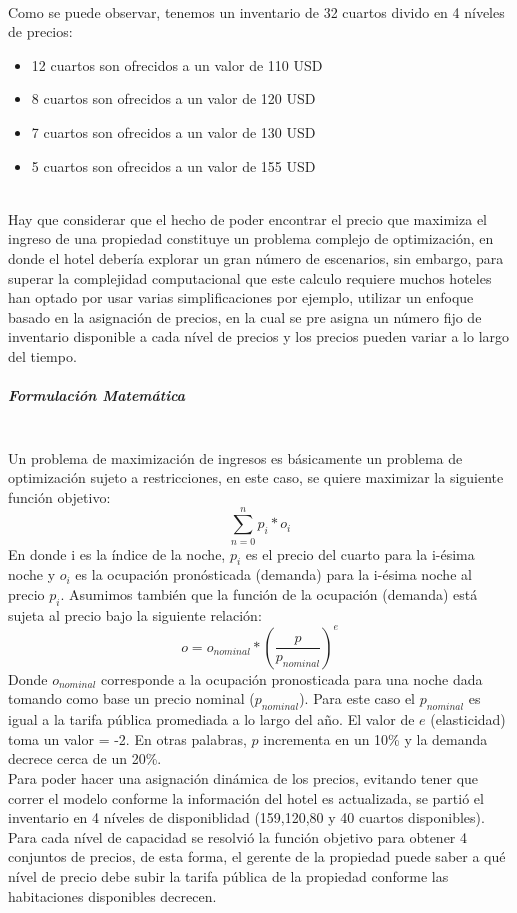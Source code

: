 \documentclass{article}\usepackage[]{graphicx}\usepackage[]{color}
\begin{document}
~\\
Como se puede observar, tenemos un inventario de 32 cuartos divido en 4 níveles de precios:
\begin{itemize}[noitemsep]
\item 12 cuartos son ofrecidos a un valor de 110 USD
\item 8 cuartos son ofrecidos a un valor de 120 USD
\item 7 cuartos son ofrecidos a un valor de 130 USD
\item 5 cuartos son ofrecidos a un valor de 155 USD
\end{itemize}
~\\
Hay que considerar que el hecho de poder encontrar el precio que maximiza el ingreso de una propiedad constituye un problema complejo de optimización, en donde el hotel debería explorar un gran número de escenarios, sin embargo, para superar la complejidad computacional que este calculo requiere muchos hoteles han optado por usar varias simplificaciones por ejemplo, utilizar un enfoque basado en la asignación de precios, en la cual se pre asigna un número fijo de inventario disponible a cada nível de precios y los precios pueden variar a lo largo del tiempo.
~\\
\subparagraph{Formulación Matemática}~\\
Un problema de maximización de ingresos es básicamente un problema de optimización sujeto a restricciones, en este caso, se quiere maximizar la siguiente función objetivo:
$$\sum_{n=0}^{n}p_i*o_i$$
En donde i es la índice de la noche, $p_i$ es el precio del cuarto para la i-ésima noche y $o_i$ es la ocupación pronósticada (demanda) para la i-ésima noche al precio $p_i$. Asumimos también que la función de la ocupación (demanda) está sujeta al precio bajo la siguiente relación:
$$o = o_{nominal} * (\frac{p}{p_{nominal}})^e$$
Donde $o_{nominal}$ corresponde a la ocupación pronosticada para una noche dada tomando como base un precio nominal ($p_{nominal}$). Para este caso el $p_{nominal}$ es igual a la tarifa pública promediada a lo largo del año. El valor de $e$ (elasticidad) toma un valor = -2. En otras palabras, $p$ incrementa en un 10\% y la demanda decrece cerca de un 20\%.
~\\
Para poder hacer una asignación dinámica de los precios, evitando tener que correr el modelo conforme la información del hotel es actualizada, se partió el inventario en 4 níveles de disponiblidad (159,120,80 y 40 cuartos disponibles). Para cada nível de capacidad se resolvió la función objetivo para obtener 4 conjuntos de precios, de esta forma, el gerente de la propiedad puede saber a qué nível de precio debe subir la tarifa pública de la propiedad conforme las habitaciones disponibles decrecen.
\end{document}
